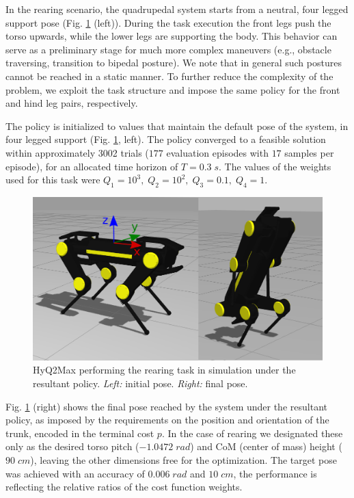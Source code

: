 \documentclass[usletter, 10pt, conference]{ieeeconf}      %
\begin{document}
In the rearing scenario, the quadrupedal system starts from a neutral, 
four legged support pose (Fig. \ref{fig:rearing_behaviour} (left)). 
During the task execution the front legs push the torso upwards, while the lower legs are 
supporting the body. This behavior can serve as a preliminary stage for much 
more complex maneuvers (e.g., obstacle traversing, transition to bipedal 
posture). We note that in general such postures cannot be reached in a static 
manner. To further reduce the complexity of the problem, we exploit the task 
structure and impose the same policy for the front and hind leg pairs,
respectively.

The policy is initialized to values that maintain the default pose of the system, 
in four legged support (Fig. \ref{fig:rearing_behaviour}, left).
The policy converged to a feasible solution within approximately 3002 trials
($177$ evaluation episodes with $17$ samples per episode), for an allocated time 
horizon of $T=0.3\;s$. The values of the weights used for this task were 
$Q_{1} = 10^3, \; Q_{2} = 10^2, \; Q_{3} = 0.1, \; Q_{4} = 1$.

\begin{figure}[h!]
 \centering
 \vspace*{+4mm}
 \includegraphics[scale=.25]{rearing_befor_after_ins.png} 
 \caption{HyQ2Max performing the rearing task in simulation under the resultant 
policy. \textit{Left:} initial pose.
 \textit{Right:} final pose.}
  \label{fig:rearing_behaviour}
\end{figure}

Fig. \ref{fig:rearing_behaviour} (right) shows the final pose reached by the 
system under the resultant policy, as imposed by the requirements on the 
position and orientation of the trunk, encoded in the terminal cost $p$. 
In the case of rearing we designated these only as the desired torso pitch ($-1.0472\; rad$)
and CoM (center of mass) height ($90\; cm$), leaving the other dimensions free for the optimization. 
The target pose was achieved with an accuracy of $0.006\; rad$  and $10 \; cm$, the performance is
reflecting the relative ratios of the cost function weights.
\end{document}
